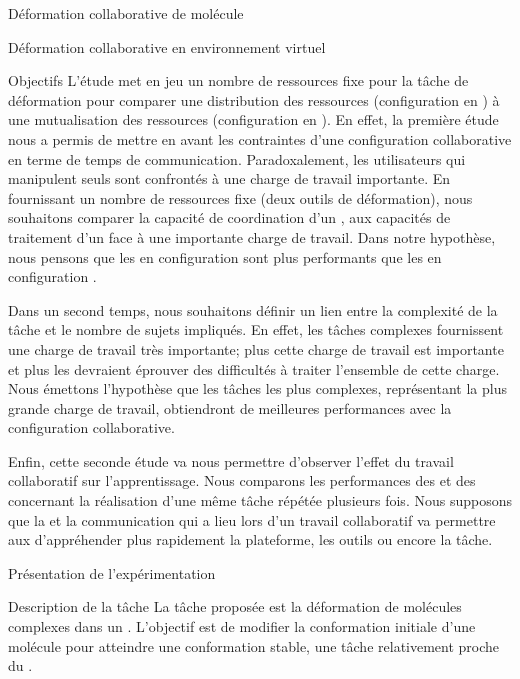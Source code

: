 \documentclass[myfrancais,ngerman,english,frenchb]{mythesis}
\begin{document}
\begin{mychapter}{Déformation collaborative de molécule}
\begin{mysection}{Déformation collaborative en environnement virtuel}
\begin{mysubsection}{Objectifs}
				L'étude met en jeu un nombre de ressources fixe pour la tâche de déformation pour comparer une distribution des ressources (configuration  en ) à une mutualisation des ressources (configuration  en ).
				En effet, la première étude nous a permis de mettre en avant les contraintes d'une configuration collaborative en terme de temps de communication.
				Paradoxalement, les utilisateurs qui manipulent seuls sont confrontés à une charge de travail importante.
				En fournissant un nombre de ressources fixe (deux outils de déformation), nous souhaitons comparer la capacité de coordination d'un , aux capacités de traitement d'un  face à une importante charge de travail.
				Dans notre hypothèse, nous pensons que les  en configuration  sont plus performants que les  en configuration .

				Dans un second temps, nous souhaitons définir un lien entre la complexité de la tâche et le nombre de sujets impliqués.
				En effet, les tâches complexes fournissent une charge de travail très importante; plus cette charge de travail est importante et plus les  devraient éprouver des difficultés à traiter l'ensemble de cette charge.
				Nous émettons l'hypothèse que les tâches les plus complexes, représentant la plus grande charge de travail, obtiendront de meilleures performances avec la configuration collaborative.

				Enfin, cette seconde étude va nous permettre d'observer l'effet du travail collaboratif sur l'apprentissage.
				Nous comparons les performances des  et des  concernant la réalisation d'une même tâche répétée plusieurs fois.
				Nous supposons que la   et la communication qui a lieu lors d'un travail collaboratif va permettre aux  d'appréhender plus rapidement la plateforme, les outils ou encore la tâche.
			\end{mysubsection}
		\end{mysection}
		\begin{mysection}{Présentation de l'expérimentation}
			\begin{mysubsection}{Description de la tâche}
				La tâche proposée est la déformation de molécules complexes dans un .
				L'objectif est de modifier la conformation initiale d'une molécule pour atteindre une conformation stable, une tâche relativement proche du .


\end{mysubsection}
\end{mysection}
\end{mychapter}
\end{document}
